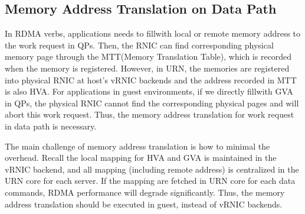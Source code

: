  
\subsection{Memory Address Translation on Data Path}
In RDMA verbs, applications needs to fillwith local or remote memory address to the work request in QPs. Then, the RNIC can find corresponding physical memory page through the MTT(Memory Translation Table), which is recorded when the memory is registered. However, in URN, the memories are registered into physical RNIC at host's vRNIC backends and the address recorded in MTT is also HVA. For applications in guest environments, if we directly fillwith GVA in QPs, the physical RNIC cannot find the corresponding physical pages and will abort this work request. Thus, the memory address translation for work request in data path is necessary. 


The main challenge of memory address translation is how to minimal the overhead. Recall the local mapping for HVA and GVA is maintained in the vRNIC backend, and all mapping (including remote address) is centralized in the URN core for each server. If the mapping are fetched in URN core for each data commands, RDMA performance will degrade significantly. Thus, the memory address translation should be executed in guest, instead of vRNIC backends. 

